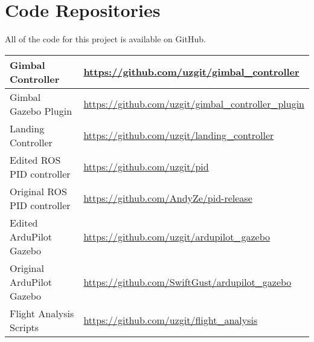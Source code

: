 

\section{Code Repositories}
\label{section:code_repositories}

All of the code for this project is available on GitHub.\\

\noindent
\begin{tabular}{|ll|}
\hline
Gimbal Controller & \url{https://github.com/uzgit/gimbal_controller} \\\hline
Gimbal Gazebo Plugin & \url{https://github.com/uzgit/gimbal_controller_plugin}\\\hline
Landing Controller & \url{https://github.com/uzgit/landing_controller} \\\hline
Edited ROS PID controller & \url{https://github.com/uzgit/pid} \\\hline
Original ROS PID controller & \url{https://github.com/AndyZe/pid-release} \\\hline
Edited ArduPilot Gazebo & \url{https://github.com/uzgit/ardupilot_gazebo} \\\hline
Original ArduPilot Gazebo & \url{https://github.com/SwiftGust/ardupilot_gazebo} \\\hline
Flight Analysis Scripts & \url{https://github.com/uzgit/flight_analysis}\\\hline
\end{tabular}

